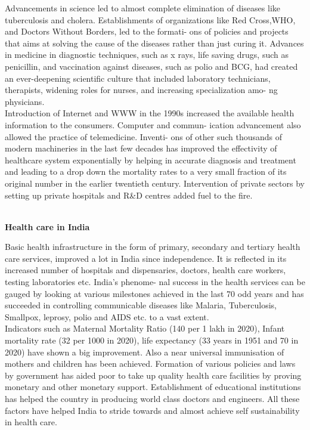 \documentclass[a4paper,14pt]{extarticle}
\begin{document}
Advancements in science led to almost complete elimination of diseases like tuberculosis and cholera. Establishments of organizations like Red Cross,WHO, and Doctors Without Borders, led to the formati- ons of policies and projects that aims at solving the cause of the diseases rather than just curing it. Advances in medicine in diagnostic techniques, such as x rays, life saving drugs, such as penicillin, and vaccination against diseases, such as polio and BCG, had created an ever-deepening scientific culture that included laboratory technicians, therapists, widening roles for nurses, and increasing specialization amo- ng physicians.\\

Introduction of Internet and WWW in the 1990s increased the available health information to the consumers. Computer and commun- ication advancement also allowed the practice of telemedicine. Inventi- ons of other such thousands of modern machineries in the last few decades has improved the effectivity of healthcare system exponentially by helping in accurate diagnosis and treatment and leading to a drop down the mortality rates to a very small fraction of its original number in the earlier twentieth century. Intervention of private sectors by setting up private hospitals and R\&D centres added fuel to the fire.\\\\

\begin{Large}
\textbf{Health care in India}\\
\end{Large}

Basic health infrastructure in the form of primary, secondary and tertiary health care services, improved a lot in India since independence. It is reflected in its increased number of hospitals and dispensaries, doctors, health care workers, testing laboratories etc. India’s phenome- nal success in the health services can be gauged by looking at various milestones achieved in the last 70 odd years and has succeeded in controlling communicable diseases like Malaria, Tuberculosis, Smallpox, leprosy, polio and AIDS etc. to a vast extent.\\

Indicators such as Maternal Mortality Ratio (140 per 1 lakh in 2020), Infant mortality rate (32 per 1000 in 2020), life expectancy (33 years in 1951 and 70 in 2020) have shown a big improvement. Also a near universal immunisation of mothers and children has been achieved. Formation of various policies and laws by government has aided poor to take up quality health care facilities by proving monetary and other monetary support. Establishment of educational institutions has helped the country in producing world class doctors and engineers. All these factors have helped India to stride towards and almost achieve self sustainability in  health care.\\\\
\end{document}
